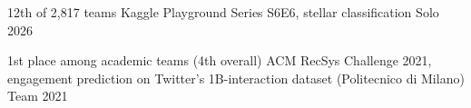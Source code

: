 

\begin{cvhonors}

  \cvhonor
    {12th of 2,817 teams} %
    {Kaggle Playground Series S6E6, stellar classification} %
    {Solo} %
    {2026} %

  \cvhonor
    {1st place among academic teams (4th overall)} %
    {ACM RecSys Challenge 2021, engagement prediction on Twitter's 1B-interaction dataset (Politecnico di Milano)} %
    {Team} %
    {2021} %


\end{cvhonors}
